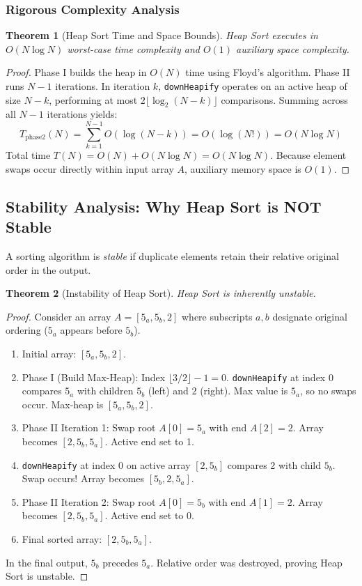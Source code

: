 \documentclass[10pt,journal,compsoc,onecolumn]{IEEEtran}
\newtheorem{theorem}{Theorem}
\begin{document}
\subsubsection{Rigorous Complexity Analysis}
\begin{theorem}[Heap Sort Time and Space Bounds]
Heap Sort executes in $O(N \log N)$ worst-case time complexity and $O(1)$ auxiliary space complexity.
\end{theorem}
\begin{proof}
Phase I builds the heap in $O(N)$ time using Floyd's algorithm. Phase II runs $N-1$ iterations. In iteration $k$, \texttt{downHeapify} operates on an active heap of size $N - k$, performing at most $2 \lfloor \log_2(N - k) \rfloor$ comparisons. Summing across all $N-1$ iterations yields:
\[
T_{\text{phase2}}(N) = \sum_{k=1}^{N-1} O(\log(N-k)) = O(\log(N!)) = O(N \log N)
\]
Total time $T(N) = O(N) + O(N \log N) = O(N \log N)$. Because element swaps occur directly within input array $A$, auxiliary memory space is $O(1)$.
\end{proof}

\subsection{Stability Analysis: Why Heap Sort is NOT Stable}

A sorting algorithm is \emph{stable} if duplicate elements retain their relative original order in the output.

\begin{theorem}[Instability of Heap Sort]
Heap Sort is inherently unstable.
\end{theorem}
\begin{proof}
Consider an array $A = [5_a, 5_b, 2]$ where subscripts $a, b$ designate original ordering ($5_a$ appears before $5_b$).
\begin{enumerate}
    \item Initial array: $[5_a, 5_b, 2]$.
    \item Phase I (Build Max-Heap): Index $\lfloor 3/2 \rfloor - 1 = 0$. \texttt{downHeapify} at index 0 compares $5_a$ with children $5_b$ (left) and $2$ (right). Max value is $5_a$, so no swaps occur. Max-heap is $[5_a, 5_b, 2]$.
    \item Phase II Iteration 1: Swap root $A[0] = 5_a$ with end $A[2] = 2$. Array becomes $[2, 5_b, 5_a]$. Active end set to 1.
    \item \texttt{downHeapify} at index 0 on active array $[2, 5_b]$ compares 2 with child $5_b$. Swap occurs! Array becomes $[5_b, 2, 5_a]$.
    \item Phase II Iteration 2: Swap root $A[0] = 5_b$ with end $A[1] = 2$. Array becomes $[2, 5_b, 5_a]$. Active end set to 0.
    \item Final sorted array: $[2, 5_b, 5_a]$.
\end{enumerate}
In the final output, $5_b$ precedes $5_a$. Relative order was destroyed, proving Heap Sort is unstable.
\end{proof}
\end{document}

